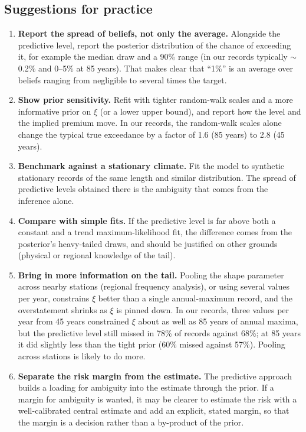 \documentclass[11pt]{article}
\begin{document}
\subsection{Suggestions for practice}\label{sec:pred-suggest}

\begin{enumerate}
\item \textbf{Report the spread of beliefs, not only the average.} Alongside the predictive level,
  report the posterior distribution of the chance of exceeding it, for example the median draw and
  a 90\% range (in our records typically $\sim$0.2\% and 0--5\% at 85 years). That makes clear that
  ``1\%'' is an average over beliefs ranging from negligible to several times the target.
\item \textbf{Show prior sensitivity.} Refit with tighter random-walk scales and a more
  informative prior on $\xi$ (or a lower upper bound), and report how the level and the implied
  premium move. In our records, the random-walk scales alone change the typical true exceedance
  by a factor of 1.6 (85 years) to 2.8 (45 years).
\item \textbf{Benchmark against a stationary climate.} Fit the model to synthetic stationary
  records of the same length and similar distribution. The spread of predictive levels obtained
  there is the ambiguity that comes from the inference alone.
\item \textbf{Compare with simple fits.} If the predictive level is far above both a constant and a
  trend maximum-likelihood fit, the difference comes from the posterior's heavy-tailed draws, and
  should be justified on other grounds (physical or regional knowledge of the tail).
\item \textbf{Bring in more information on the tail.} Pooling the shape parameter across nearby
  stations (regional frequency analysis), or using several values per year, constrains $\xi$
  better than a single annual-maximum record, and the overstatement shrinks as $\xi$ is pinned down.
  In our records, three values per year from 45 years constrained $\xi$ about as well as 85 years
  of annual maxima, but the predictive level still missed in 78\% of records against 68\%; at
  85 years it did slightly less than the tight prior (60\% missed against 57\%). Pooling across
  stations is likely to do more.
\item \textbf{Separate the risk margin from the estimate.} The predictive approach builds a loading
  for ambiguity into the estimate through the prior. If a margin for ambiguity is wanted, it may be
  clearer to estimate the risk with a well-calibrated central estimate and add an explicit,
  stated margin, so that the margin is a decision rather than a by-product of the prior.
\end{enumerate}
\end{document}
